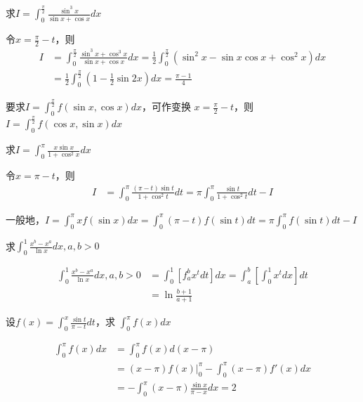 \documentclass{article}
\begin{document}
\begin{examplle}[]
求\(I=\displaystyle\int_0^{\frac{\pi}{2}}\frac{\sin^3x}{\sin x+\cos x}dx\)

令\(x=\frac{\pi}{2}-t\)，则
\begin{align*}
I&=\int_0^{\frac{\pi}{2}}\frac{\sin^3x+\cos^3x}{\sin x+\cos x}dx=
\frac{1}{2}\int_0^{\frac{\pi}{2}}(\sin^2x-\sin x\cos x+\cos^2x)dx\\
&=\frac{1}{2}\int_0^{\frac{\pi}{2}}(1-\frac{1}{2}\sin 2x)dx=\frac{\pi-1}{4}
\end{align*}
\end{examplle}

\begin{remark}
要求\(I=\displaystyle\int^{\frac{\pi}{2}}_0f(\sin x,\cos x)dx\)，可作变换
\(x=\frac{\pi}{2}-t\)，则\(I=\displaystyle\int^{\frac{\pi}{2}}_0f(\cos x,\sin x)dx\)
\end{remark}

\begin{examplle}[]
求\(I=\int^\pi_0\frac{x\sin x}{1+\cos^2x}dx\)

令\(x=\pi-t\)，则
\begin{align*}
I&=\int^\pi_0\frac{(\pi-t)\sin t}{1+\cos^2t}dt=
\pi\int^\pi_0\frac{\sin t}{1+\cos^2t}dt-I
\end{align*}
\end{examplle}

\begin{remark}
一般地，\(I=\int^\pi_0xf(\sin x)dx=\int^\pi_0(\pi-t)f(\sin
   t)dt=\pi\int^\pi_0f(\sin t)dt-I\)
\end{remark}

\begin{examplle}[]
求\(\int_0^1\frac{x^b-x^a}{\ln x}dx,a,b>0\)

\begin{align*}
\int_0^1\frac{x^b-x^a}{\ln x}dx,a,b>0&=
\int^1_0\left[f^b_ax^tdt
\right]dx=\int^b_a\left[\int^1_0x^tdx
\right]dt\\
&=\ln\frac{b+1}{a+1}
\end{align*}
\end{examplle}

\begin{examplle}[]
设\(\displaystyle f(x)=\int_0^x\frac{\sin t}{\pi-t}dt\)，求
\(\int_0^\pi f(x)dx\)

\begin{align*}
\int^\pi_0f(x)dx&=\int_0^\pi f(x)d(x-\pi)\\
&=(x-\pi)f(x)|^\pi_0-\int_0^\pi(x-\pi)f'(x)dx\\
&=-\int_0^\pi (x-\pi)\frac{\sin x}{\pi-x}dx=2
\end{align*}
\end{examplle}
\end{document}
